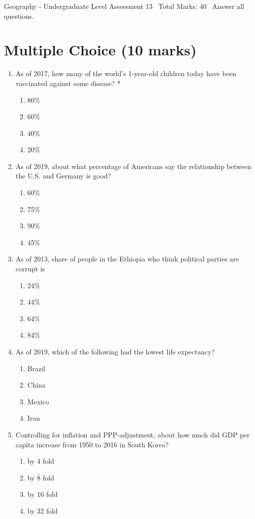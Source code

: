 \documentclass[12pt]{article}
\begin{document}
\begin{center}
Geography - Undergraduate Level Assessment 13 \
Total Marks: 40 \
Answer all questions.
\end{center}

\section*{Multiple Choice (10 marks)}
\begin{enumerate}[label=\arabic*.]
\item As of 2017, how many of the world's 1-year-old children today have been vaccinated against some disease? *
\begin{enumerate}[label=(\alph*)]
    \item 80\%
    \item 60\%
    \item 40\%
    \item 20\%
\end{enumerate}
\item As of 2019, about what percentage of Americans say the relationship between the U.S. and Germany is good?
\begin{enumerate}[label=(\alph*)]
    \item 60\%
    \item 75\%
    \item 90\%
    \item 45\%
\end{enumerate}
\item As of 2013, share of people in the Ethiopia who think political parties are corrupt is
\begin{enumerate}[label=(\alph*)]
    \item 24\%
    \item 44\%
    \item 64\%
    \item 84\%
\end{enumerate}
\item As of 2019, which of the following had the lowest life expectancy?
\begin{enumerate}[label=(\alph*)]
    \item Brazil
    \item China
    \item Mexico
    \item Iran
\end{enumerate}
\item Controlling for inflation and PPP-adjustment, about how much did GDP per capita increase from 1950 to 2016 in South Korea?
\begin{enumerate}[label=(\alph*)]
    \item by 4 fold
    \item by 8 fold
    \item by 16 fold
    \item by 32 fold
\end{enumerate}
\end{enumerate}
\end{document}
